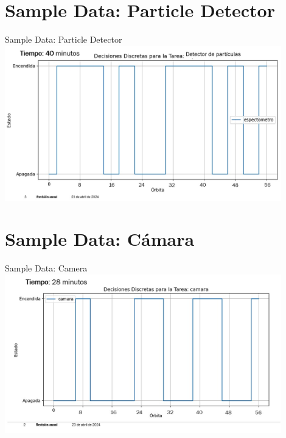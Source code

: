 \documentclass[10pt]{beamer}
\begin{document}
\section{Sample Data: Particle Detector}
\begin{frame}{Sample Data: Particle Detector}
  \href{https://github.com/EnigmaK9/linx/tree/main/06-progress_04_22_2024/padilla-villanueva/sql}{\includegraphics[width=0.9\textwidth]{detector.jpeg}}

\end{frame}

\section{Sample Data: Cámara}
\begin{frame}{Sample Data: Camera}
  \href{https://github.com/EnigmaK9/linx/tree/main/06-progress_04_22_2024/padilla-villanueva/sql}{\includegraphics[width=0.9\textwidth]{camara.jpeg}}

\end{frame}
\end{document}
